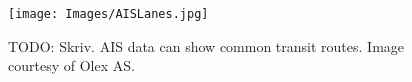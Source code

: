 
\begin{figure}
    \centering
    \label{FIG: AIS lanes}
    \texttt{[image: Images/AISLanes.jpg]}
    \caption{TODO: Skriv. AIS data can show common transit routes. Image courtesy of Olex AS.}
\end{figure}



\newpage